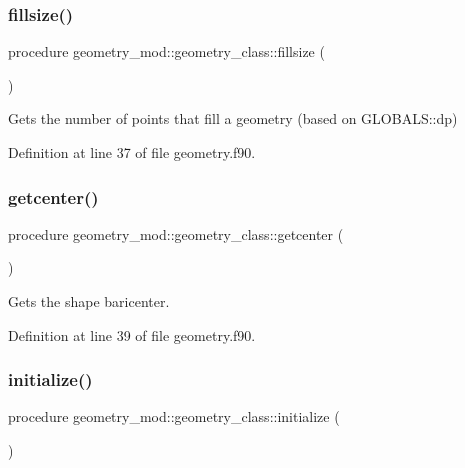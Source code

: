 \subsubsection{\texorpdfstring{fillsize()}{fillsize()}}
{\footnotesize\ttfamily procedure geometry\+\_\+mod\+::geometry\+\_\+class\+::fillsize (\begin{DoxyParamCaption}{ }\end{DoxyParamCaption})\hspace{0.3cm}{\ttfamily [private]}}



Gets the number of points that fill a geometry (based on G\+L\+O\+B\+A\+L\+S\+::dp) 



Definition at line 37 of file geometry.\+f90.

\mbox{\label{structgeometry__mod_1_1geometry__class_a691891378a677185f2f13e736f68ff11}} 
\subsubsection{\texorpdfstring{getcenter()}{getcenter()}}
{\footnotesize\ttfamily procedure geometry\+\_\+mod\+::geometry\+\_\+class\+::getcenter (\begin{DoxyParamCaption}{ }\end{DoxyParamCaption})\hspace{0.3cm}{\ttfamily [private]}}



Gets the shape baricenter. 



Definition at line 39 of file geometry.\+f90.

\mbox{\label{structgeometry__mod_1_1geometry__class_a97a9a90ff4143d41fe57eb0e6d1c76a1}} 
\subsubsection{\texorpdfstring{initialize()}{initialize()}}
{\footnotesize\ttfamily procedure geometry\+\_\+mod\+::geometry\+\_\+class\+::initialize (\begin{DoxyParamCaption}{ }\end{DoxyParamCaption})\hspace{0.3cm}{\ttfamily [private]}}



